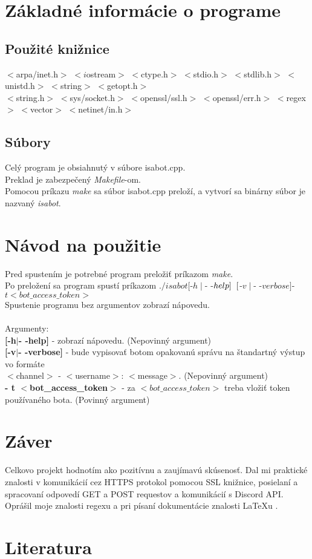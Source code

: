 \documentclass[11pt,a4paper]{article}
\begin{document}
	
	\newpage
	\section {Základné informácie o programe}
	\subsection{Použité knižnice}
	$<$arpa/inet.h$>$
	$<i$ostream$>$
	$<$ctype.h$>$
	$<$stdio.h$>$
	$<$stdlib.h$>$
	$<$unistd.h$>$
	$<$string$>$
	$<$getopt.h$>$\\
	$<$string.h$>$
	$<$sys/socket.h$>$  	
	$<$openssl/ssl.h$>$
	$<$openssl/err.h$>$
	$<$regex$>$
	$<$vector$>$
	$<$netinet/in.h$>$
	\subsection{Súbory}
	Celý program je obsiahnutý v súbore isabot.cpp.\\
	Preklad je zabezpečený \emph{Makefile}-om.\\
	Pomocou príkazu \emph{make} sa súbor isabot.cpp preloží, a vytvorí sa binárny súbor je nazvaný \emph{isabot}.

	
	\section{Návod na použitie}
	Pred spustením je potrebné program preložiť príkazom \emph{make}.\\
	Po preložení sa program spustí príkazom {$./isabot [ $-$h\mid$- -$help] \hspace{0.2cm} [$-$v\mid$- -$verbose] $\hspace{0.2cm}-$t <bot\_access\_token>$}\\
	Spustenie programu bez argumentov zobrazí nápovedu.\\
	\\Argumenty:\\
	\textbf{[-h$\mid$- -help]} - zobrazí nápovedu. (Nepovinný argument)\\
	\textbf{[-v$\mid$- -verbose]} - bude vypisovať botom opakovanú správu na štandartný výstup vo formáte\\ $<$channel$>$ - $<$username$>$: $<$message$>$. (Nepovinný argument)\\
	\textbf{- t $<$bot\_access\_token$>$} - za $<bot\_access\_token>$ treba vložiť token používaného bota. (Povinný argument)
	
	\section{Záver}
	Celkovo projekt hodnotím ako pozitívnu a zaujímavú skúsenosť.
	Dal mi praktické znalosti v komunikácií cez HTTPS protokol pomocou SSL knižnice, posielaní a spracovaní odpovedí GET a POST requestov a komunikácií s Discord API. Oprášil moje znalosti regexu a pri písaní dokumentácie znalosti \LaTeX u .

\newpage
\section{Literatura}

		
	
\end{document}
